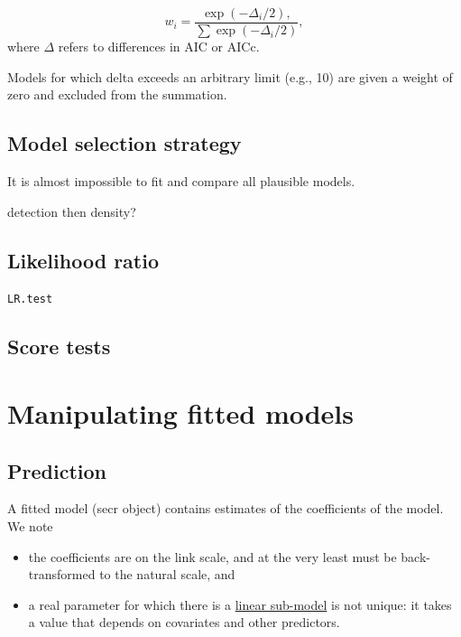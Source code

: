 \documentclass[
]{book}
\providecommand{\tightlist}{%
  \setlength{\itemsep}{0pt}\setlength{\parskip}{0pt}}
\begin{document}
\begin{equation}
w_i = \frac{\exp(-\Delta_i / 2),}{\sum{\exp(-\Delta_i / 2)}},
\end{equation}
where \(\Delta\) refers to differences in AIC or AICc.

Models for which delta exceeds an arbitrary limit (e.g., 10) are given a weight of zero and excluded from the summation.

\subsection{Model selection strategy}\label{model-selection-strategy}

It is almost impossible to fit and compare all plausible models.

detection then density?

\subsection{Likelihood ratio}\label{likelihood-ratio}

\texttt{LR.test}

\subsection{Score tests}\label{score-tests}

\section{Manipulating fitted models}\label{manipulating-fitted-models}

\subsection{Prediction}\label{prediction}

A fitted model (secr object) contains estimates of the coefficients of the model. We note

\begin{itemize}
\tightlist
\item
  the coefficients are on the link scale, and at the very least must be back-transformed to the natural scale, and
\item
  a real parameter for which there is a \hyperref[linear-submodels]{linear sub-model} is not unique: it takes a value that depends on covariates and other predictors.
\end{itemize}
\end{document}
